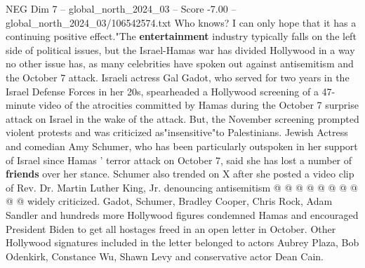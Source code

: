 \begin{textsample}{NEG Dim 7 – global\_north\_2024\_03 – Score -7.00 – global\_north\_2024\_03/106542574.txt}
Who knows?
I can only hope that it has a continuing positive effect."The \textbf{entertainment} industry typically falls on the left side of political issues, but the Israel-Hamas war has divided Hollywood in a way no other issue has, as many celebrities have spoken out against antisemitism and the October 7 attack.
Israeli actress Gal Gadot, who served for two years in the Israel Defense Forces in her 20s, spearheaded a Hollywood screening of a 47-minute video of the atrocities committed by Hamas during the October 7 surprise attack on Israel in the wake of the attack.
But, the November screening prompted violent protests and was criticized as"insensitive"to Palestinians.
Jewish Actress and comedian Amy Schumer, who has been particularly outspoken in her support of Israel since Hamas ' terror attack on October 7, said she has lost a number of \textbf{friends} over her stance.
Schumer also trended on X after she posted a video clip of Rev.
Dr.
Martin Luther King, Jr. denouncing antisemitism @ @ @ @ @ @ @ @ @ @ widely criticized.
Gadot, Schumer, Bradley Cooper, Chris Rock, Adam Sandler and hundreds more Hollywood figures condemned Hamas and encouraged President Biden to get all hostages freed in an open letter in October.
Other Hollywood signatures included in the letter belonged to actors Aubrey Plaza, Bob Odenkirk, Constance Wu, Shawn Levy and conservative actor Dean Cain.

\end{textsample}
